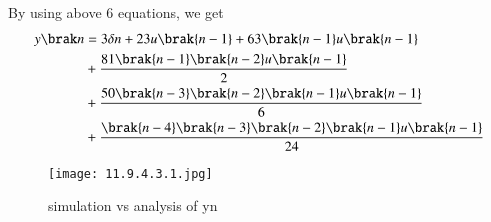 \documentclass[journal,12pt,twocolumn]{IEEEtran}
\theoremstyle{remark}
\begin{document}
By using above 6 equations, we get
\begin{align}
\notag y\brak n&=3\delta n+23u\brak{n-1}+63\brak{n-1}u\brak{n-1}\\&\notag+\frac{81\brak{n-1}\brak{n-2}u\brak{n-1}}{2}\\&\notag+\frac{50\brak{n-3}\brak{n-2}\brak{n-1}u\brak{n-1}}{6}\\&+\frac{\brak{n-4}\brak{n-3}\brak{n-2}\brak{n-1}u\brak{n-1}}{24}
\end{align}
\begin{figure}
    \centering
    \texttt{[image: 11.9.4.3.1.jpg]}
    \caption{simulation vs analysis of y\brak n}
\end{figure}
\end{document}
